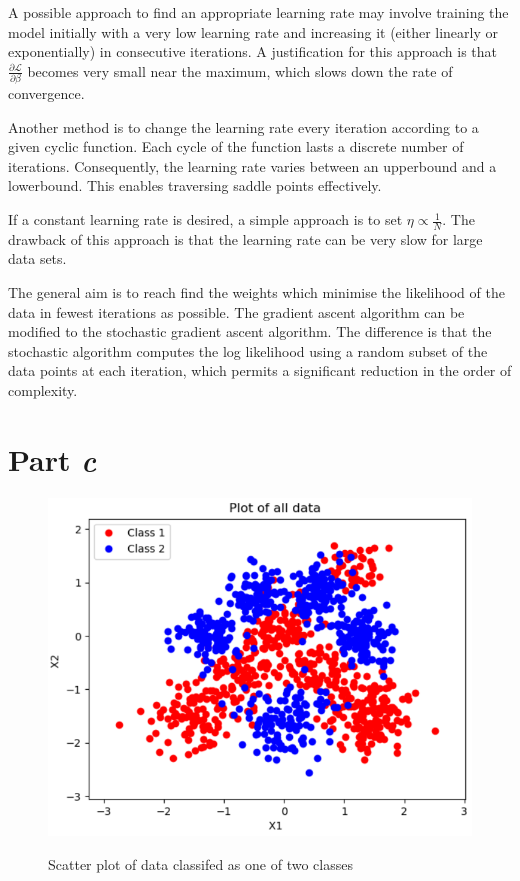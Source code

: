 \documentclass[twocolumn]{article}
\begin{document}
A possible approach to find an appropriate learning rate may involve training the model initially with a very low learning rate and increasing it (either linearly or exponentially) in consecutive iterations. A justification for this approach is that $\frac{\partial \mathcal{L}}{\partial \beta}$ becomes very small near the maximum, which slows down the rate of convergence.

Another method is to change the learning rate every iteration according to a given cyclic function. Each cycle of the function lasts a discrete number of iterations. Consequently, the learning rate varies between an upperbound and a lowerbound. This enables traversing saddle points effectively.

If a constant learning rate is desired, a simple approach is to set $\eta\propto \frac{1}{N}$. The drawback of this approach is that the learning rate can be very slow for large data sets.

The general aim is to reach find the weights which minimise the likelihood of the data in fewest iterations as possible. The gradient ascent algorithm can be modified to the stochastic gradient ascent algorithm. The difference is that the stochastic algorithm computes the log likelihood using a random subset of the data points at each iteration, which permits a significant reduction in the order of complexity.

\section{Part \textit{c}}

\begin{figure}[!htb]
	\centering\includegraphics[width=\columnwidth]{1}\\
	\caption{Scatter plot of data classifed as one of two classes}\label{triangulo}
\end{figure}
\end{document}
